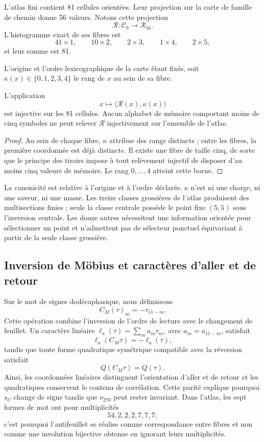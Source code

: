 L'atlas fini contient 81 cellules orientées. Leur projection sur la carte
de famille de chemin donne 56 valeurs. Notons cette projection
\[
 \mathcal R:\mathcal C_9\longrightarrow\mathcal R_{56}.
\]
L'histogramme exact de ses fibres est
\[
 41\times1,
 \qquad10\times2,
 \qquad2\times3,
 \qquad1\times4,
 \qquad2\times5,
\]
et leur somme est 81.

L'origine et l'ordre lexicographique de la carte étant fixés, soit
\(\kappa(x)\in\{0,1,2,3,4\}\) le rang de \(x\) au sein de sa fibre.

\begin{theorem}
\label{thm:selector-interno-minimo}
L'application
\[
 x\longmapsto\bigl(\mathcal R(x),\kappa(x)\bigr)
\]
est injective sur les 81 cellules. Aucun alphabet de mémoire comportant moins de
cinq symboles ne peut relever \(\mathcal R\) injectivement sur l'ensemble de
l'atlas.
\end{theorem}

\begin{proof}
Au sein de chaque fibre, \(\kappa\) attribue des rangs distincts ; entre les fibres, la
première coordonnée est déjà distincte. Il existe une fibre de taille cinq, de sorte que
le principe des tiroirs impose à tout relèvement injectif de disposer d'au moins
cinq valeurs de mémoire. Le rang \(0,\ldots,4\) atteint cette borne.
\end{proof}

La canonicité est relative à l'origine et à l'ordre déclarés. \(\kappa\) n'est
ni une charge, ni une saveur, ni une masse. Les treize classes grossières de l'atlas produisent
des multisections finies ; seule la classe centrale possède le point fixe \((5,5)\)
sous l'inversion centrale. Les douze autres nécessitent une information orientée
pour sélectionner un point et n'admettent pas de sélecteur ponctuel équivariant à partir
de la seule classe grossière.

\subsection{Inversion de Möbius et caractères d'aller et de retour}

Sur le mot de signes dodécaphasique, nous définissons
\[
 C_M(\tau)_m=-\tau_{11-m}.
\]
Cette opération combine l'inversion de l'ordre de lecture avec le changement de
feuillet. Un caractère linéaire
\(\ell_a(\tau)=\sum_ma_m\tau_m\), avec
\(a_m=a_{11-m}\), satisfait
\[
 \ell_a(C_M\tau)=-\ell_a(\tau),
\]
tandis que toute forme quadratique symétrique compatible avec la réversion
satisfait
\[
 Q(C_M\tau)=Q(\tau).
\]
Ainsi, les coordonnées linéaires distinguent l'orientation d'aller et de retour et les
quadratiques conservent le contenu de corrélation. Cette parité explique
pourquoi \(s_C\) change de signe tandis que \(\nu_{270}\) peut rester
invariant. Dans l'atlas, les sept formes de mot ont pour multiplicités
\[
 54,2,2,2,7,7,7;
\]
c'est pourquoi l'antifeuillet se réalise comme correspondance entre fibres et non comme
une involution bijective obtenue en ignorant leurs multiplicités.

